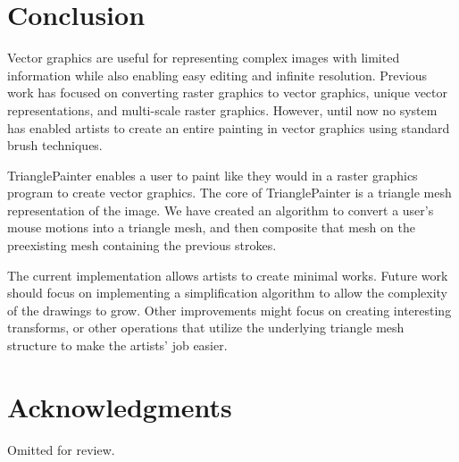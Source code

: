 \documentclass[review]{acmsiggraph}
\begin{document}
\section{Conclusion}
Vector graphics are useful for representing complex images with limited information
while also enabling easy editing and infinite resolution. Previous work has focused
on converting raster graphics to vector graphics, unique vector representations, and multi-scale
raster graphics. However, until now no system
has enabled artists to create an entire painting in vector graphics using standard brush techniques. 

TrianglePainter enables a user to paint like they would in a raster graphics program 
to create vector graphics. The core of TrianglePainter is a triangle mesh representation of the image.
We have created an algorithm to convert a user's mouse motions into a triangle mesh, and then composite
that mesh on the preexisting mesh containing the previous strokes.

The current implementation allows artists to create minimal works. Future work should focus on
implementing a simplification algorithm to allow the complexity of the drawings to grow. Other
improvements might focus on creating interesting transforms, or other operations that utilize
the underlying triangle mesh structure to make the artists' job easier.


\section*{Acknowledgments}

Omitted for review.



\end{document}
